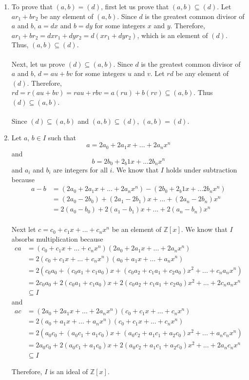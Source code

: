 \documentclass{article}
\begin{document}
\begin{enumerate}
\item To prove that $(a,b) = (d)$, first let us prove that $(a,b) \subseteq (d)$.
Let $ar_1 + br_2$ be any element of $(a,b)$.  Since $d$ is the greatest common
divisor of $a$ and $b$, $a = dx$ and $b = dy$ for some integers $x$ and $y$.
Therefore, $ar_1 + br_2 = dxr_1 + dyr_2 = d(xr_{1} + dyr_{2})$, which is an
element of $(d)$.  Thus, $(a,b) \subseteq (d)$. \\ \\
Next, let us prove $(d) \subseteq (a,b)$.  Since $d$ is the greatest common
divisor of $a$ and $b$, $d = au + bv$ for some integers $u$ and $v$.  Let
$rd$ be any element of $(d)$.
Therefore, $rd = r(au + bv) = rau + rbv = a(ru) + b(rv) \subseteq (a,b)$.
Thus $(d) \subseteq (a,b)$. \\ \\
Since $(d) \subseteq (a,b)$ and $(a,b) \subseteq (d)$, $(a,b) = (d)$.

\item
Let $a$, $b \in I$ such that
\[a = 2a_0 + 2a_{1}x + ... + 2a_{n}x^n
\]
and
\[b = 2b_0 + 2_b{1}x + ... 2b_{n}x^n
\]
and $a_i$ and $b_i$ are integers for all
$i$.  We know that $I$ holds under subtraction because
\begin{align*}
a - b &= (2a_0 + 2a_{1}x + ... + 2a_{n}x^{n}) - (2b_0 + 2_b{1}x + ... 2b_{n}x^n) \\
&= (2a_0 - 2b_0) + (2a_{1} - 2b_{1})x + ... + (2a_{n} - 2b_{n})x^n \\
&= 2(a_0 - b_0) + 2(a_{1} - b_{1})x + ... + 2(a_{n} - b_{n})x^n \\
\end{align*}

Next let $c = c_0 + c_{1}x + ... + c_{n}x^n$ be an element of $\mathbb{Z}[x]$.
We know that $I$ absorbs multiplication because
\begin{align*}
ca &= (c_0 + c_{1}x + ... + c_{n}x^{n})(2a_0 + 2a_{1}x + ...+ 2a_{n}x^{n}) \\
&= 2(c_0 + c_{1}x + ... + c_{n}x^{n})(a_0 + a_{1}x + ... + a_{n}x^{n}) \\
&= 2(c_{0}a_{0} + (c_{0}a_{1} + c_{1}a_{0})x + (c_{0}a_{2} + c_{1}a_{1} + c_{2}a_{0})x^{2}
+ ... + c_{n}a_{n}x^{n}) \\
&= 2c_{0}a_{0} + 2(c_{0}a_{1} + c_{1}a_{0})x + 2(c_{0}a_{2} + c_{1}a_{1} + c_{2}a_{0})x^{2}
+ ... + 2c_{n}a_{n}x^{n} \\
&\subseteq I
\end{align*}
and
\begin{align*}
ac &= (2a_0 + 2a_{1}x + ...+ 2a_{n}x^{n})(c_0 + c_{1}x + ... + c_{n}x^{n}) \\
&= 2(a_0 + a_{1}x + ... + a_{n}x^{n})(c_0 + c_{1}x + ... + c_{n}x^{n}) \\
&= 2(a_{0}c_{0} + (a_{0}c_{1} + a_{1}c_{0})x + (a_{0}c_{2} + a_{1}c_{1} + a_{2}c_{0})x^{2}
+ ... + a_{n}c_{n}x^{n}) \\
&= 2a_{0}c_{0} + 2(a_{0}c_{1} + a_{1}c_{0})x + 2(a_{0}c_{2} + a_{1}c_{1} + a_{2}c_{0})x^{2}
+ ... + 2a_{n}c_{n}x^{n} \\
&\subseteq I
\end{align*}

Therefore, $I$ is an ideal of $\mathbb{Z}[x]$.

\end{enumerate}
\end{document}
